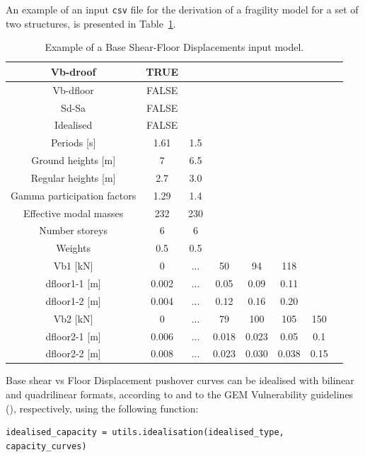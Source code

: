 An example of an input \verb=csv= file for the derivation of a fragility model for a set of two structures, is presented in Table~\ref{table:Vb-dfloor_input}.

\begin {table}[htb]
\caption{Example of a Base Shear-Floor Displacements input model.}
\label{table:Vb-dfloor_input}
\begin{center}
  \begin{tabular}{ | c | c | c | c | c | c | c | c |}
  \hline
    Vb-droof & TRUE &  &  & & & \\ \hline
    Vb-dfloor & FALSE & & & & &  \\ \hline
    Sd-Sa & FALSE & & & & & \\ \hline
    Idealised & FALSE & & & & & \\ \hline
    Periods [s] & 1.61 & 1.5 & & & & \\ \hline
    Ground heights [m] & 7 & 6.5 & & & & \\ \hline
    Regular heights [m] & 2.7 & 3.0 & & & & \\ \hline
    Gamma participation factors & 1.29 & 1.4 & & & & \\ \hline
    Effective modal masses	& 232 &	230 & & & & \\ \hline
    Number storeys & 6 & 6 & & & & \\ \hline
    Weights & 0.5 & 0.5 & & & & \\ \hline
    Vb1 [kN] & 0	& ...	& 50	& 94	& 118	& \\ \hline
	  dfloor1-1 [m] & 0.002	& ...	& 0.05	& 0.09	& 0.11	& \\ \hline
	  dfloor1-2 [m] & 0.004	& ...	& 0.12	& 0.16	& 0.20	& \\ \hline
    Vb2 [kN] & 0	& ...	& 79	& 100	& 105	& 150 \\ \hline
    dfloor2-1 [m] & 0.006 &	...	& 0.018	& 0.023	& 0.05	& 0.1 \\ \hline
	dfloor2-2 [m] & 0.008	& ... &	0.023	& 0.030	& 0.038	& 0.15 \\ \hline
  \end{tabular}
\end{center}
\end{table}

Base shear vs Floor Displacement pushover curves can be idealised with bilinear and quadrilinear formats, according to \citep{FEMA4402005} and to the GEM Vulnerability guidelines (\citep{Dayala2014}), respectively, using the following function:

\begin{Verbatim}[frame=single, commandchars=\\\{\}, samepage=true]
idealised_capacity = utils.idealisation(idealised_type, capacity_curves)
\end{Verbatim}

